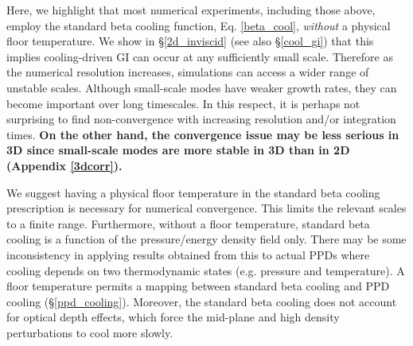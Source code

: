 
Here, we highlight that most numerical experiments, including those
above, employ the standard beta cooling function, Eq. \ref{beta_cool},
\emph{without} a physical floor temperature. We show in \S\ref{2d_inviscid}
(see also \S\ref{cool_gi}) that this implies cooling-driven GI can
occur at any sufficiently small scale. Therefore as the numerical
resolution increases, simulations can access a wider range of unstable
scales. Although small-scale modes have weaker growth rates, they can 
become important over long timescales.   
In this respect, it is perhaps not surprising to find non-convergence with 
increasing resolution and/or integration times. 
{\bf
  On the other hand, the convergence issue may be
  less serious in 3D since small-scale modes are more stable in 3D
  than in 2D (Appendix \ref{3dcorr}). 
}

We suggest having a physical floor temperature in the standard beta
cooling prescription is  necessary for  
numerical convergence. This limits the
relevant scales to a finite range.  %
Furthermore, without a floor temperature, standard beta cooling is
a function of the pressure/energy density field only. 
There may be some inconsistency in applying results obtained from 
this to actual PPDs where cooling depends on two thermodynamic states (e.g. pressure and
temperature). A floor temperature permits a mapping between standard beta
cooling and PPD cooling (\S\ref{ppd_cooling}). 
Moreover, the standard beta cooling does 
not account for optical depth effects, which force the mid-plane 
and high density perturbations to cool more slowly.

%

